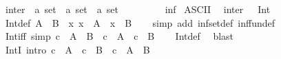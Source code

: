 \begin{isabellebody}
%
\isadelimdocument
%
\endisadelimdocument
{}\isamarkupfalse%
\ inter\ {\isacharcolon}{\kern0pt}{\isacharcolon}{\kern0pt}\ {\isachardoublequoteopen}{\isacharprime}{\kern0pt}a\ set\ {\isasymRightarrow}\ {\isacharprime}{\kern0pt}a\ set\ {\isasymRightarrow}\ {\isacharprime}{\kern0pt}a\ set{\isachardoublequoteclose}\ \ {\isacharparenleft}{\kern0pt}\ {\isachardoublequoteopen}{\isasyminter}{\isachardoublequoteclose}\ {}{}{\isacharparenright}{\kern0pt}\isanewline
\ \ \ {\isachardoublequoteopen}{\isacharparenleft}{\kern0pt}{\isasyminter}{\isacharparenright}{\kern0pt}\ {\isasymequiv}\ inf{\isachardoublequoteclose}\isanewline
\isanewline
{}\isamarkupfalse%
\ {\isacharparenleft}{\kern0pt}ASCII{\isacharparenright}{\kern0pt}\isanewline
\ \ inter\ \ {\isacharparenleft}{\kern0pt}\ {\isachardoublequoteopen}Int{\isachardoublequoteclose}\ {}{}{\isacharparenright}{\kern0pt}\isanewline
\isanewline
{}\isamarkupfalse%
\ Int{\isacharunderscore}{\kern0pt}def{\isacharcolon}{\kern0pt}\ {\isachardoublequoteopen}A\ {\isasyminter}\ B\ {\isacharequal}{\kern0pt}\ {\isacharbraceleft}{\kern0pt}x{\isachardot}{\kern0pt}\ x\ {\isasymin}\ A\ {\isasymand}\ x\ {\isasymin}\ B{\isacharbraceright}{\kern0pt}{\isachardoublequoteclose}\isanewline
%
\isadelimproof
\ \ %
\endisadelimproof
%
\isatagproof
{}\isamarkupfalse%
\ {\isacharparenleft}{\kern0pt}simp\ add{\isacharcolon}{\kern0pt}\ inf{\isacharunderscore}{\kern0pt}set{\isacharunderscore}{\kern0pt}def\ inf{\isacharunderscore}{\kern0pt}fun{\isacharunderscore}{\kern0pt}def{\isacharparenright}{\kern0pt}%
\endisatagproof
{\isafoldproof}%
%
\isadelimproof
\isanewline
%
\endisadelimproof
\isanewline
{}\isamarkupfalse%
\ Int{\isacharunderscore}{\kern0pt}iff\ {\isacharbrackleft}{\kern0pt}simp{\isacharbrackright}{\kern0pt}{\isacharcolon}{\kern0pt}\ {\isachardoublequoteopen}c\ {\isasymin}\ A\ {\isasyminter}\ B\ {\isasymlongleftrightarrow}\ c\ {\isasymin}\ A\ {\isasymand}\ c\ {\isasymin}\ B{\isachardoublequoteclose}\isanewline
%
\isadelimproof
\ \ %
\endisadelimproof
%
\isatagproof
{}\isamarkupfalse%
\ Int{\isacharunderscore}{\kern0pt}def\ \isamarkupfalse%
\ blast%
\endisatagproof
{\isafoldproof}%
%
\isadelimproof
\isanewline
%
\endisadelimproof
\isanewline
{}\isamarkupfalse%
\ IntI\ {\isacharbrackleft}{\kern0pt}intro{\isacharbang}{\kern0pt}{\isacharbrackright}{\kern0pt}{\isacharcolon}{\kern0pt}\ {\isachardoublequoteopen}c\ {\isasymin}\ A\ {\isasymLongrightarrow}\ c\ {\isasymin}\ B\ {\isasymLongrightarrow}\ c\ {\isasymin}\ A\ {\isasyminter}\ B{\isachardoublequoteclose}\isanewline

\end{isabellebody}
